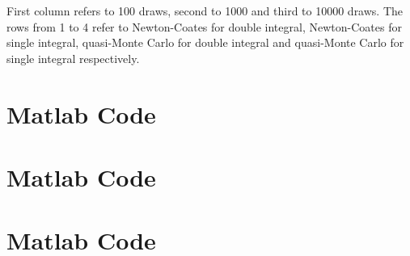 \documentclass[a4paper,12pt]{article}
\begin{document}
First column refers to 100 draws, second to 1000 and third to 10000 draws. The rows from 1 to 4 refer to Newton-Coates for double integral, Newton-Coates for single integral, quasi-Monte Carlo for double integral and quasi-Monte Carlo for single integral respectively.

\vspace{\baselineskip}




\newpage
\section*{Matlab Code} 

\newpage
\section*{Matlab Code} 

\newpage
\section*{Matlab Code} 
\end{document}
